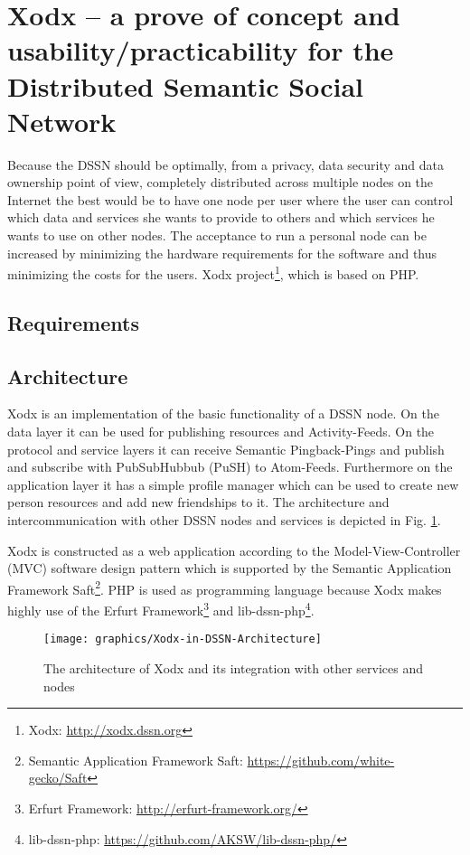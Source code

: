 \documentclass{llncs}
\begin{document}
\section{Xodx – a prove of concept and usability/practicability for the Distributed Semantic Social Network}
Because the DSSN should be optimally, from a privacy, data security and data ownership point of view, completely distributed across multiple nodes on the Internet the best would be to have one node per user where the user can control which data and services she wants to provide to others and which services he wants to use on other nodes.
The acceptance to run a personal node can be increased by minimizing the hardware requirements for the software and thus minimizing the costs for the users.
Xodx project\footnote{Xodx: \url{http://xodx.dssn.org}}, which is based on PHP.

\subsection{Requirements}


\subsection{Architecture}
Xodx is an implementation of the basic functionality of a DSSN node.
On the data layer it can be used for publishing resources and Activity-Feeds.
On the protocol and service layers it can receive Semantic Pingback-Pings and publish and subscribe with PubSubHubbub (PuSH) to Atom-Feeds.
Furthermore on the application layer it has a simple profile manager which can be used to create new person resources and add new friendships to it.
The architecture and intercommunication with other DSSN nodes and services is depicted in Fig. \ref{Xodx_arch}.

Xodx is constructed as a web application according to the Model-View-Controller (MVC) software design pattern which is supported by the Semantic Application Framework Saft\footnote{Semantic Application Framework Saft: \url{https://github.com/white-gecko/Saft}}.
PHP is used as programming language because Xodx makes highly use of the Erfurt Framework\footnote{Erfurt Framework: \url{http://erfurt-framework.org/}} and lib-dssn-php\footnote{lib-dssn-php: \url{https://github.com/AKSW/lib-dssn-php/}}.

\begin{figure}
    \begin{center}
        \texttt{[image: graphics/Xodx-in-DSSN-Architecture]}
    \end{center}
\caption{The architecture of Xodx and its integration with other services and nodes}
\label{Xodx_arch}
\end{figure}
\end{document}
